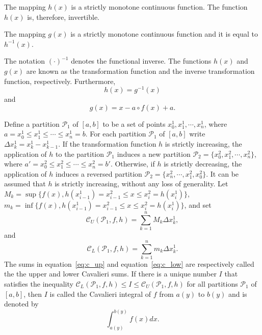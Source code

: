 \documentclass[twoside,reqno,11pt]{fcaa-var} %
\begin{document}
\begin{theorem}
The mapping $h(x)$ is a strictly monotone continuous function. The function $h(x)$ is, therefore, invertible.
\end{theorem}

\begin{theorem}
\label{t:inv}
The mapping $g(x)$ is a strictly monotone continuous function and it is equal to $h^{-1}(x)$.
\end{theorem}

\noindent
The notation $(\cdot)^{-1}$ denotes the functional inverse. The functions $h(x)$ and $g(x)$ are known as the transformation function and the inverse transformation function, respectively. Furthermore,
\begin{equation}
\label{eq:h_def}
h(x) = g^{-1}(x) 
\end{equation}
and
\begin{equation}
\label{eq:g_def}
g(x) = x - a\circ f(x) + a. 
\end{equation}

\begin{definition}\label{def:cav_integral}
Define a partition $\mathcal{P}_1$ of $[a,b]$ to be a set of points $x_0^1, x_1^1,\cdots,x_n^1$, 
where $a = x_0^1 \leq x_1^1 \leq \cdots \leq x_n^1 = b$. For each partition 
$\mathcal{P}_1$ of $[a,b]$ write $\Delta x_k^1 = x_k^1-x_{k-1}^1$. 
If the transformation function $h$ is strictly increasing,
the application of $h$ to the partition $\mathcal{P}_1$ induces a new partition $\mathcal{P}_2 = \{x_0^2, x_1^2,\cdots, x_n^2\}$,  
where $a' = x_0^2 \leq x_1^2 \leq \cdots \leq x_n^2 = b'$.
Otherwise, if $h$ is strictly decreasing, the application of $h$ induces a reversed partition $\mathcal{P}_2 = \{x_n^2, \cdots, x_1^2,x_0^2\}$. It
can be assumed that $h$ is strictly increasing, without any loss of generality.  Let 
$M_k = \sup \{f (x), h(x_{i-1}^1) = x_{i-1}^2 \leq x \leq x_i^2 = h(x_i^1)\}$, $m_k = \inf \{f (x), h(x_{i-1}^1) = x_{i-1}^2 \leq x \leq x_i^2 = h(x_i^1)\}$, and set 
\begin{equation}
\label{eq:c_up}
\mathcal{C}_U(\mathcal{P}_1,f,h) = \sum_{k=1}^n M_k \Delta x_k^1, 
\end{equation}
and
\begin{equation}
\label{eq:c_low}
\mathcal{C}_L(\mathcal{P}_1,f,h) = \sum_{k=1}^n m_k \Delta x_k^1. 
\end{equation}
The sums in equation~\eqref{eq:c_up} and equation~\eqref{eq:c_low} are respectively called the the upper and lower Cavalieri sums.
If there is a unique number $I$ that satisfies the inequality $\mathcal{C}_L(\mathcal{P}_1,f,h)\leq I \leq \mathcal{C}_U(\mathcal{P}_1,f,h)$ for all 
partitions $\mathcal{P}_1$ of $[a,b]$, then $I$ is called the Cavalieri integral of $f$ from $a(y)$ to $b(y)$ and is denoted by
\begin{equation}
\int_{a(y)}^{b(y)} f(x) dx.
\end{equation}
\end{definition}
\end{document}
